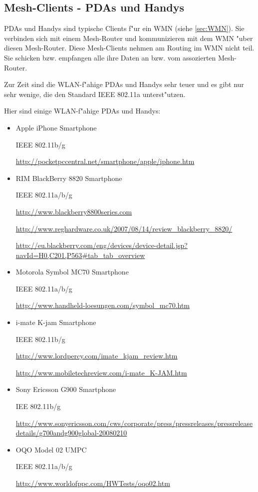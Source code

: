 \subsection{Mesh-Clients - PDAs und Handys}

PDAs und Handys sind typische Clients f"ur ein WMN (siehe \ref{sec:WMN}).
Sie verbinden sich mit einem Mesh-Router und kommunizieren mit dem WMN
"uber diesen Mesh-Router.  Diese Mesh-Clients nehmen am Routing im WMN
nicht teil. Sie schicken bzw. empfangen alle ihre Daten an bzw. vom
assozierten Mesh-Router.

Zur Zeit sind die WLAN-f"ahige PDAs und Handys sehr teuer und
es gibt nur sehr wenige, die den Standard IEEE 802.11a unterst"utzen.

Hier sind einige WLAN-f"ahige PDAs und Handys:

\begin{itemize}	

\item Apple iPhone Smartphone

IEEE 802.11b/g

\url{http://pocketpccentral.net/smartphone/apple/iphone.htm}

\item RIM BlackBerry 8820 Smartphone

IEEE 802.11a/b/g

\url{http://www.blackberry8800series.com}

\url{http://www.reghardware.co.uk/2007/08/14/review\_blackberry\_8820/}

\url{http://eu.blackberry.com/eng/devices/device-detail.jsp?navId=H0,C201,P563#tab\_tab\_overview}

\item Motorola Symbol MC70 Smartphone

IEEE 802.11a/b/g

\url{http://www.handheld-loesungen.com/symbol\_mc70.htm}

\item i-mate K-jam Smartphone

IEEE 802.11b/g

\url{http://www.lordpercy.com/imate\_kjam\_review.htm}

\url{http://www.mobiletechreview.com/i-mate\_K-JAM.htm}

\item Sony Ericsson G900 Smartphone

IEE 802.11b/g

\url{http://www.sonyericsson.com/cws/corporate/press/pressreleases/pressreleasedetails/g700andg900global-20080210}

\item OQO Model 02 UMPC

IEEE 802.11a/b/g

\url{http://www.worldofppc.com/HWTests/oqo02.htm}

\end{itemize}
